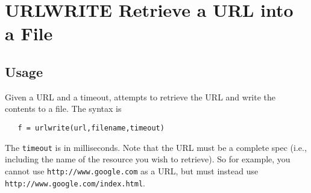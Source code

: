 \section{URLWRITE Retrieve a URL into a File}

\subsection{Usage}

Given a URL and a timeout, attempts to retrieve the URL and write the
contents to a file.  The syntax is
\begin{verbatim}
   f = urlwrite(url,filename,timeout)
\end{verbatim}
The \verb|timeout| is in milliseconds.  Note that the URL must be a complete
spec (i.e., including the name of the resource you wish to retrieve).  So
for example, you cannot use \verb|http://www.google.com| as a URL, but must 
instead use \verb|http://www.google.com/index.html|.
